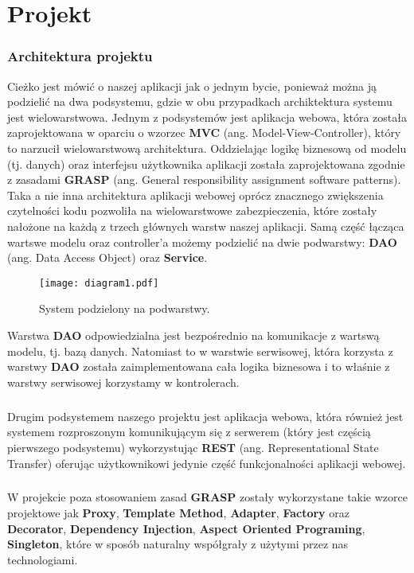 \chapter{Projekt}
\subsection{Architektura projektu}
Cieżko jest mówić o naszej aplikacji jak o jednym bycie, ponieważ można ją podzielić na dwa podsystemu, gdzie w obu przypadkach archiktektura systemu jest wielowarstwowa. Jednym z podsystemów jest aplikacja webowa, która została zaprojektowana w oparciu o wzorzec \textbf{MVC} (ang. Model-View-Controller), który to narzucił wielowarstwową architektura. Oddzielając logikę biznesową od modelu (tj. danych) oraz interfejsu użytkownika aplikacji została zaprojektowana zgodnie z zasadami \textbf{GRASP} (ang. General responsibility assignment software patterns). Taka a nie inna architektura aplikacji webowej oprócz znacznego zwiększenia czytelności kodu pozwoliła na wielowarstwowe zabezpieczenia, które zostały nałożone na każdą z trzech głównych warstw naszej aplikacji. Samą część łącząca wartswe modelu oraz controller'a możemy podzielić na dwie podwarstwy: \textbf{DAO} (ang. Data Access Object) oraz \textbf{Service}.
\begin{figure}[H]
  \centering
  \texttt{[image: diagram1.pdf]}
  \caption{System podzielony na podwarstwy.}
\end{figure}
Warstwa \textbf{DAO} odpowiedzialna jest bezpośrednio na komunikacje z wartswą modelu, tj. bazą danych. Natomiast to w warstwie serwisowej, która korzysta z warstwy \textbf{DAO} została zaimplementowana cała logika biznesowa i to właśnie z warstwy serwisowej korzystamy w kontrolerach.

\paragraph{}
Drugim podsystemem naszego projektu jest aplikacja webowa, która również jest systemem rozproszonym komunikującym się z serwerem (który jest częścią pierwszego podsystemu) wykorzystując \textbf{REST} (ang. Representational State Transfer) oferując użytkownikowi jedynie część funkcjonalności aplikacji webowej.

\paragraph{}
W projekcie poza stosowaniem zasad \textbf{GRASP} zostały wykorzystane takie wzorce projektowe jak \textbf{Proxy}, \textbf{Template Method}, \textbf{Adapter}, \textbf{Factory} oraz \textbf{Decorator}, \textbf{Dependency Injection}, \textbf{Aspect Oriented Programing}, \textbf{Singleton}, które w sposób naturalny współgrały z użytymi przez nas technologiami.
